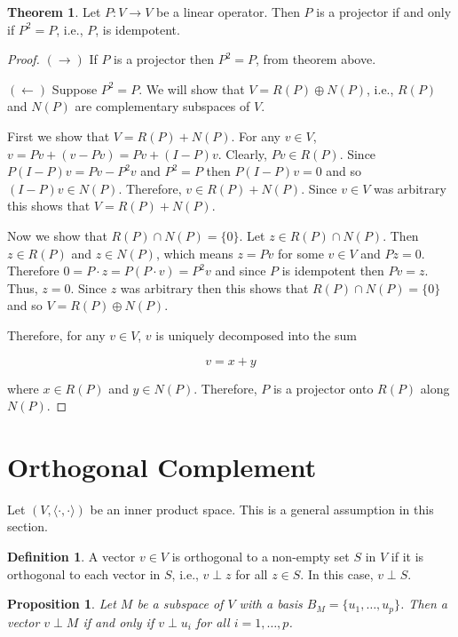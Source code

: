 \documentclass[12pt]{article}
\newtheorem*{proposition}{Proposition}
\theoremstyle{definition}
\newtheorem*{definition}{Definition}
\newtheorem{theorem}{Theorem}[section]  %
\begin{document}
\begin{theorem}
Let $P : V \rightarrow V$ be a linear operator. Then $P$ is a projector if and only if
$P^2 = P$, i.e., $P$, is idempotent.
\end{theorem}

\begin{proof}
$(\rightarrow)$ If $P$ is a projector then $P^2 = P$, from theorem above.

$(\leftarrow)$ Suppose $P^2 = P$. We will show that $V = R(P) \oplus N(P)$, i.e.,
$R(P)$ and $N(P)$ are complementary subspaces of $V$.

First we show that $V = R(P) + N(P)$. For any $v \in V$, $v = Pv + (v - Pv) = Pv + (I - P)v$.
Clearly, $Pv \in R(P)$. Since $P(I-P)v = Pv - P^2v$ and $P^2 = P$ then $P(I - P)v = 0$ and
so $(I - P)v \in N(P)$. Therefore, $v \in R(P) + N(P)$. Since $v \in V$ was arbitrary this
shows that $V = R(P) + N(P)$.

Now we show that $R(P) \cap N(P) = \{0\}$. Let $z \in R(P) \cap N(P)$. Then $z \in R(P)$ and
$z \in N(P)$, which means $z = Pv$ for some $v \in V$ and $Pz = 0$. 
Therefore $0 = P \cdot z = P(P \cdot v) = P^2v$ and since $P$ is idempotent then
$Pv = z$. Thus, $z = 0$. Since $z$ was arbitrary then this shows that
$R(P) \cap N(P) = \{0\}$ and so $V = R(P) \oplus N(P)$.

Therefore, for any $v \in V$, $v$ is uniquely decomposed into the sum

\[v = x + y\]

where $x \in R(P)$ and $y \in N(P)$. Therefore, $P$ is a projector onto $R(P)$ along $N(P)$.
\end{proof}

\section{Orthogonal Complement}

Let $(V, \langle \cdot, \cdot \rangle)$ be an inner product space. This is a general assumption in
this section.

\begin{definition}
A vector $v \in V$ is orthogonal to a non-empty set $S$ in $V$ if it is orthogonal to each
vector in $S$, i.e., $v \perp z$ for all $z \in S$. In this case, $v \perp S$.
\end{definition}

\begin{proposition}
Let $M$ be a subspace of $V$ with a basis $B_M = \{u_1, \ldots, u_p\}$. Then a vector $v \perp M$ if
and only if $v \perp u_i$ for all $i = 1, \ldots, p$.
\end{proposition}
\end{document}
